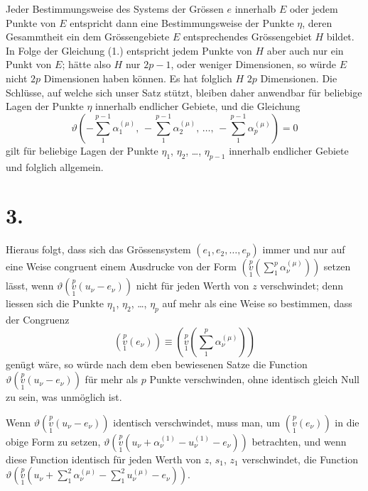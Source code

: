 \documentclass{article}
\begin{document}
Jeder Bestimmungsweise des Systems der Grössen $e$ innerhalb $E$ oder jedem Punkte von $E$ entspricht dann eine Bestimmungsweise der Punkte $\eta$, deren Gesammtheit ein dem Grössengebiete $E$ entsprechendes Grössengebiet $H$ bildet. In Folge der Gleichung (1.) entspricht jedem Punkte von $H$ aber auch nur ein Punkt von $E$; hätte also $H$ nur $2p-1$, oder weniger Dimensionen, so würde $E$ nicht $2p$ Dimensionen haben können. Es hat folglich $H$ $2p$ Dimensionen. Die Schlüsse, auf welche sich unser Satz stützt, bleiben daher anwendbar für beliebige Lagen der Punkte $\eta$ innerhalb endlicher Gebiete, und die Gleichung
\[
\vartheta\left(-\sum_1^{p-1} \alpha_1^{(\mu)},\, -\sum_1^{p-1} \alpha_2^{(\mu)},\, \dots,\, -\sum_1^{p-1} \alpha_p^{(\mu)}\right) = 0
\]
gilt für beliebige Lagen der Punkte $\eta_1$, $\eta_2$, \dots, $\eta_{p-1}$ innerhalb endlicher Gebiete und folglich allgemein.

\section*{3.}

Hieraus folgt, dass sich das Grössensystem $(e_1, e_2, \dots, e_p)$ immer und nur auf eine Weise congruent einem Ausdrucke von der Form $\left(\overset{p}{\underset{1}{v}}\left(\displaystyle\sum_1^p \alpha_\nu^{(\mu)}\right)\right)$ setzen lässt, wenn $\vartheta\left(\overset{p}{\underset{1}{v}}(u_\nu - e_\nu)\right)$ nicht für jeden Werth von $z$ verschwindet; denn liessen sich die Punkte $\eta_1$, $\eta_2$, \dots, $\eta_p$ auf mehr als eine Weise so bestimmen, dass der Congruenz
\[
\left(\overset{p}{\underset{1}{v}}(e_\nu)\right) \equiv \left(\overset{p}{\underset{1}{v}}\left(\sum_1^p \alpha_\nu^{(\mu)}\right)\right)
\]
genügt wäre, so würde nach dem eben bewiesenen Satze die Function $\vartheta\left(\overset{p}{\underset{1}{v}}(u_\nu - e_\nu)\right)$ für mehr als $p$ Punkte verschwinden, ohne identisch gleich Null zu sein, was unmöglich ist.

Wenn $\vartheta\left(\overset{p}{\underset{1}{v}}(u_\nu - e_\nu)\right)$ identisch verschwindet, muss man, um $\left(\overset{p}{\underset{1}{v}}(e_\nu)\right)$ in die obige Form zu setzen, $\vartheta\left(\overset{p}{\underset{1}{v}}(u_\nu + \alpha_\nu^{(1)} - u_\nu^{(1)} - e_\nu)\right)$ betrachten, und wenn diese Function identisch für jeden Werth von $z$, $s_1$, $z_1$ verschwindet, die Function $\vartheta\left(\overset{p}{\underset{1}{v}}\left(u_\nu + \displaystyle\sum_1^2 \alpha_\nu^{(\mu)} - \displaystyle\sum_1^2 u_\nu^{(\mu)} - e_\nu\right)\right)$.
\end{document}
